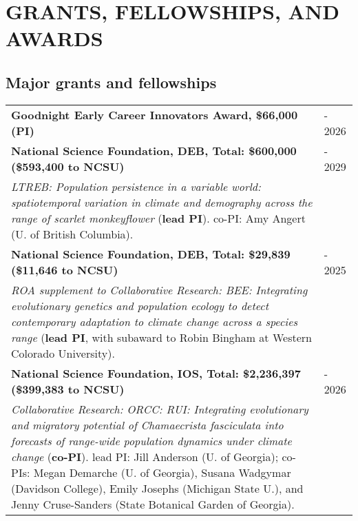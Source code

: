 \documentclass[11pt,english]{article}
\providecommand{\tabularnewline}{\\}
\begin{document}

\section*{GRANTS, FELLOWSHIPS, AND AWARDS}
\vspace{-0.5ex}

\subsection*{Major grants and fellowships}

\renewcommand{\arraystretch}{1.2}
\begin{tabularx}{\textwidth}{@{}>{\raggedright}p{5.25in} >{\raggedleft}X@{}}

\textbf{{Goodnight Early Career Innovators Award, \$66,000 (PI)}} & 2023 - 2026 \tabularnewline

\small \textbf{{National Science Foundation, DEB, Total: \$600,000} (\$593,400 to NCSU)} & 2024 - 2029 \tabularnewline
\addtolength{\leftskip}{5ex}\emph{LTREB: Population persistence in a variable world: spatiotemporal variation in climate and demography across the range of scarlet monkeyflower} (\textbf{lead PI}). \small{co-PI: Amy Angert (U. of British Columbia).} \tabularnewline

\small \textbf{{National Science Foundation, DEB, Total: \$29,839} (\$11,646 to NCSU)} & 2023 - 2025 \tabularnewline
\addtolength{\leftskip}{5ex}\emph{ROA supplement to Collaborative Research: BEE: Integrating evolutionary genetics and population ecology to detect contemporary adaptation to climate change across a species range} (\textbf{lead PI}, with subaward to Robin Bingham at Western Colorado University).  \tabularnewline

\small \textbf{{National Science Foundation, IOS, Total: \$2,236,397} (\$399,383 to NCSU)} & 2023 - 2026 \tabularnewline
\addtolength{\leftskip}{5ex}\emph{Collaborative Research: ORCC: RUI: Integrating evolutionary and migratory potential of Chamaecrista fasciculata into forecasts of range-wide population dynamics under climate change} (\textbf{co-PI}). \small{lead PI: Jill Anderson (U. of Georgia); co-PIs: Megan Demarche (U. of Georgia), Susana Wadgymar (Davidson College), Emily Josephs (Michigan State U.), and Jenny Cruse-Sanders (State Botanical Garden of Georgia).} \tabularnewline

\end{tabularx}
\end{document}

